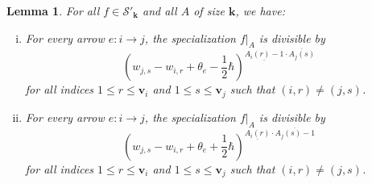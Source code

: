 \documentclass[11pt,reqno]{amsart}
\renewcommand{\mathbf}{\mathbold}
\numberwithin{equation}{section}
\newtheorem{Lemma}[equation]{Lemma}
\theoremstyle{definition}
\newcommand{\cS}{\mathcal{S}}
\newcommand{\bk}{\mathbf{k}}
\newcommand{\bv}{\mathbf{v}}
\renewcommand{\bv}{\mathbf{v}} %
\newcommand{\shu}{\cS}
\begin{document}
\begin{Lemma}
For all $f \in \shu'_\bk$ and all $A$ of size $\bk$, we have:
\begin{enumerate}[(i)]
\item For every arrow $e : i \rightarrow j$, the specialization $f|_A$ is divisible by
$$
(w_{j,s} - w_{i,r} + \theta_e - \frac{1}{2}\hbar)^{\underline{A_i(r) - 1} \cdot \overline{A_j(s)}}
$$
for all indices $1 \leq r \leq \bv_i$ and $1 \leq s\leq \bv_j$  such that $(i,r) \neq (j,s)$.

\item  For every arrow $e : i \rightarrow j$, the specialization $f|_A$ is divisible by
$$
(w_{j,s} - w_{i,r} + \theta_e + \frac{1}{2}\hbar)^{\underline{A_i(r)} \cdot \overline{A_j(s) - 1}}
$$
for all indices $1 \leq r \leq \bv_i$ and $1 \leq s\leq \bv_j$ such that $(i,r) \neq (j,s)$.

\end{enumerate}
\end{Lemma}
\end{document}
